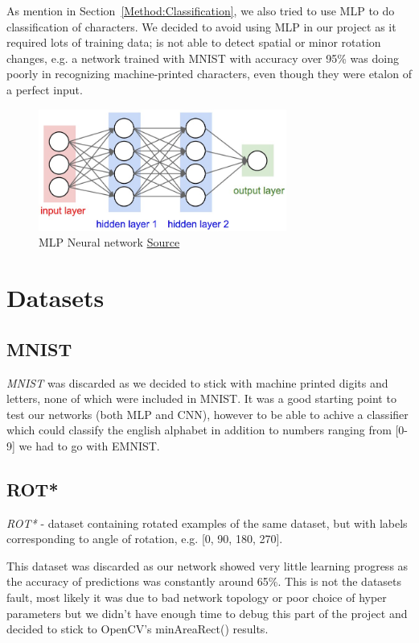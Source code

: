 \documentclass[Report.tex]{subfiles}
\begin{document}
\begin{flushleft}
  As mention in Section~\ref{Method:Classification}, we also tried to use MLP to do classification of characters.
  We decided to avoid using MLP in our project as it required lots of training data; is not able to detect spatial or minor rotation changes, e.g. a network trained with MNIST with accuracy over 95\% was doing poorly in recognizing machine-printed characters, even though they were etalon of a perfect input.

  \begin{figure}[H]
    \centering
    \includegraphics[height=4cm]{res/neural_net2.jpeg}
    \caption{MLP Neural network \href{http://cs231n.github.io/neural-networks-1/}{Source}}
    \label{fig:neural_net2}
  \end{figure}

\end{flushleft}

\section{Datasets}
\label{sec:Datasets}
\subsection{MNIST}
\textit{MNIST} was discarded as we decided to stick with machine printed digits and letters, none of which were included in MNIST. It was a good starting point to test our networks (both MLP and CNN), however to be able to achive a classifier which could classify the english alphabet in addition to numbers ranging from [0-9] we had to go with EMNIST.

\subsection{ROT*}
\textit{ROT*} - dataset containing rotated examples of the same dataset, but with labels corresponding to angle of rotation, e.g. [0, 90, 180, 270]. \par
This dataset was discarded as our network showed very little learning progress as the accuracy of predictions was constantly around 65\%. This is not the datasets fault, most likely it was due to bad network topology or poor choice of hyper parameters but we didn't have enough time to debug this part of the project and decided to stick to OpenCV's minAreaRect() results.
\end{document}
